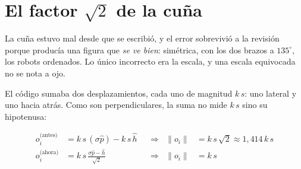 \documentclass[11pt,a4paper]{article}
\theoremstyle{plain}
\newcommand{\hh}{\hat{h}}
\newcommand{\pp}{\hat{p}}
\begin{document}
\section{El factor \texorpdfstring{$\sqrt{2}$}{raiz de 2} de la cuña}

La cuña estuvo mal desde que se escribió, y el error sobrevivió a la revisión
porque producía una figura que \emph{se ve bien}: simétrica, con los dos brazos
a $135^\circ$, los robots ordenados. Lo único incorrecto era la escala, y una
escala equivocada no se nota a ojo.

El código sumaba dos desplazamientos, cada uno de magnitud $k\,s$: uno lateral
y uno hacia atrás. Como son perpendiculares, la suma no mide $k\,s$ sino su
hipotenusa:

\begin{align}
  o_i^{\text{(antes)}} &= k\,s\,(\sigma\pp) - k\,s\,\hh
  &&\Longrightarrow&
  \lVert o_i \rVert &= k\,s\,\sqrt{2} \approx 1{,}414\,k\,s
  \label{eq:bug}\\[2pt]
  o_i^{\text{(ahora)}} &= k\,s\,\frac{\sigma\pp - \hh}{\sqrt{2}}
  &&\Longrightarrow&
  \lVert o_i \rVert &= k\,s
  \label{eq:fix}
\end{align}
\end{document}
